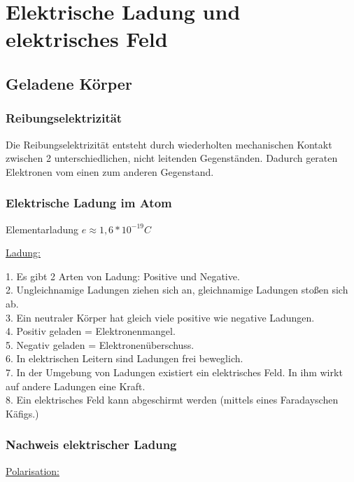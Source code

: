 \section{Elektrische Ladung und elektrisches Feld}
\subsection{Geladene Körper}
\subsubsection{Reibungselektrizität}
Die Reibungselektrizität entsteht durch wiederholten mechanischen Kontakt zwischen 2 unterschiedlichen, nicht leitenden Gegenständen. Dadurch geraten Elektronen vom einen zum anderen Gegenstand.

\subsubsection{Elektrische Ladung im Atom}

Elementarladung $ e \approx 1,6 \ast 10^{-19}C $


\vspace{3mm}
\underline{Ladung:}

\vspace{2mm}
1. Es gibt 2 Arten von Ladung: Positive und Negative. \\
2. Ungleichnamige Ladungen ziehen sich an, gleichnamige Ladungen stoßen sich ab. \\
3. Ein neutraler Körper hat gleich viele positive wie negative Ladungen. \\
4. Positiv geladen = Elektronenmangel. \\
5. Negativ geladen = Elektronenüberschuss. \\
6. In elektrischen Leitern sind Ladungen frei beweglich. \\
7. In der Umgebung von Ladungen existiert ein elektrisches Feld. In ihm wirkt auf andere Ladungen eine Kraft. \\
8. Ein elektrisches Feld kann abgeschirmt werden (mittels eines Faradayschen Käfigs.) \\

\subsubsection{Nachweis elektrischer Ladung}

\vspace{2mm}
\underline{Polarisation:}


